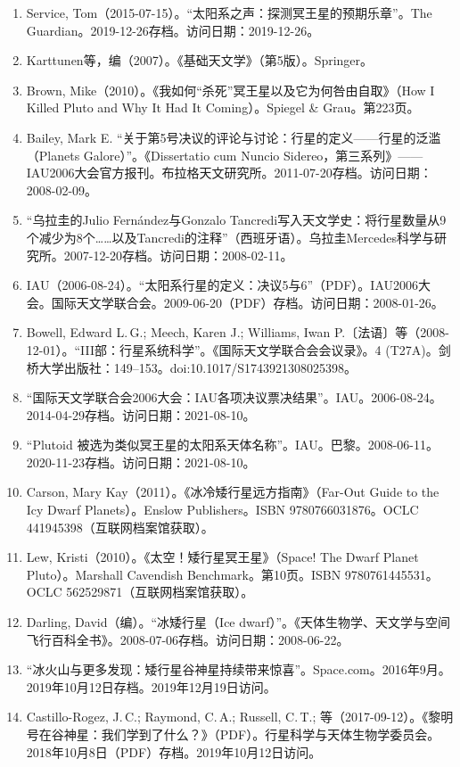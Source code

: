 \begin{enumerate}
\item Service, Tom（2015-07-15）。“太阳系之声：探测冥王星的预期乐章”。The Guardian。2019-12-26存档。访问日期：2019-12-26。
\item Karttunen等，编（2007）。《基础天文学》（第5版）。Springer。
\item Brown, Mike（2010）。《我如何“杀死”冥王星以及它为何咎由自取》（How I Killed Pluto and Why It Had It Coming）。Spiegel \& Grau。第223页。
\item Bailey, Mark E. “关于第5号决议的评论与讨论：行星的定义——行星的泛滥（Planets Galore）”。《Dissertatio cum Nuncio Sidereo，第三系列》——IAU2006大会官方报刊。布拉格天文研究所。2011-07-20存档。访问日期：2008-02-09。
\item “乌拉圭的Julio Fernández与Gonzalo Tancredi写入天文学史：将行星数量从9个减少为8个……以及Tancredi的注释”（西班牙语）。乌拉圭Mercedes科学与研究所。2007-12-20存档。访问日期：2008-02-11。
\item IAU（2006-08-24）。“太阳系行星的定义：决议5与6”（PDF）。IAU2006大会。国际天文学联合会。2009-06-20（PDF）存档。访问日期：2008-01-26。
\item Bowell, Edward L.\,G.; Meech, Karen J.; Williams, Iwan P.〔法语〕等（2008-12-01）。“III部：行星系统科学”。《国际天文学联合会会议录》。4 (T27A)。剑桥大学出版社：149–153。doi:10.1017/S1743921308025398。
\item “国际天文学联合会2006大会：IAU各项决议票决结果”。IAU。2006-08-24。2014-04-29存档。访问日期：2021-08-10。
\item “Plutoid 被选为类似冥王星的太阳系天体名称”。IAU。巴黎。2008-06-11。2020-11-23存档。访问日期：2021-08-10。
\item Carson, Mary Kay（2011）。《冰冷矮行星远方指南》（Far-Out Guide to the Icy Dwarf Planets）。Enslow Publishers。ISBN 9780766031876。OCLC 441945398（互联网档案馆获取）。
\item Lew, Kristi（2010）。《太空！矮行星冥王星》（Space! The Dwarf Planet Pluto）。Marshall Cavendish Benchmark。第10页。ISBN 9780761445531。OCLC 562529871（互联网档案馆获取）。
\item Darling, David（编）。“冰矮行星（Ice dwarf）”。《天体生物学、天文学与空间飞行百科全书》。2008-07-06存档。访问日期：2008-06-22。
\item “冰火山与更多发现：矮行星谷神星持续带来惊喜”。Space.com。2016年9月。2019年10月12日存档。2019年12月19日访问。
\item Castillo-Rogez, J.\,C.; Raymond, C.\,A.; Russell, C.\,T.; 等（2017-09-12）。《黎明号在谷神星：我们学到了什么？》（PDF）。行星科学与天体生物学委员会。2018年10月8日（PDF）存档。2019年10月12日访问。

\end{enumerate}
